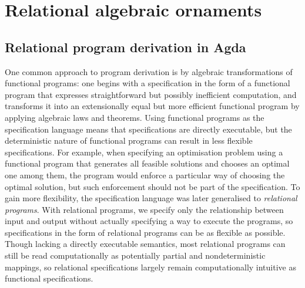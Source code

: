 \chapter{Relational algebraic ornaments}
\label{chap:algebraic}

\section{Relational program derivation in Agda}
\label{sec:relations}


One common approach to program derivation is by algebraic transformations of functional programs: one begins with a specification in the form of a functional program that expresses straightforward but possibly inefficient computation, and transforms it into an extensionally equal but more efficient functional program by applying algebraic laws and theorems.
Using functional programs as the specification language means that specifications are directly executable, but the deterministic nature of functional programs can result in less flexible specifications.
For example, when specifying an optimisation problem using a functional program that generates all feasible solutions and chooses an optimal one among them, the program would enforce a particular way of choosing the optimal solution, but such enforcement should not be part of the specification.
To gain more flexibility, the specification language was later generalised to \emph{relational programs}.
With relational programs, we specify only the relationship between input and output without actually specifying a way to execute the programs, so specifications in the form of relational programs can be as flexible as possible.
Though lacking a directly executable semantics, most relational programs can still be read computationally as potentially partial and nondeterministic mappings, so relational specifications largely remain computationally intuitive as functional specifications.

